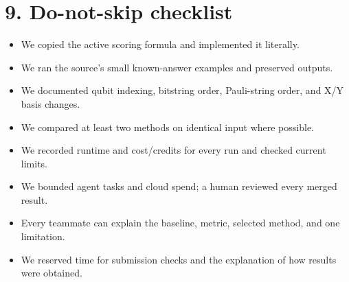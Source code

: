 \documentclass[11pt,letterpaper]{article}
\newcommand{\checkline}{\(\square\) }
\begin{document}
\section*{9. Do-not-skip checklist}
\begin{itemize}
  \item[\checkline] We copied the active scoring formula and implemented it literally.
  \item[\checkline] We ran the source's small known-answer examples and preserved outputs.
  \item[\checkline] We documented qubit indexing, bitstring order, Pauli-string order, and X/Y basis changes.
  \item[\checkline] We compared at least two methods on identical input where possible.
  \item[\checkline] We recorded runtime and cost/credits for every run and checked current limits.
  \item[\checkline] We bounded agent tasks and cloud spend; a human reviewed every merged result.
  \item[\checkline] Every teammate can explain the baseline, metric, selected method, and one limitation.
  \item[\checkline] We reserved time for submission checks and the explanation of how results were obtained.
\end{itemize}
\end{document}
